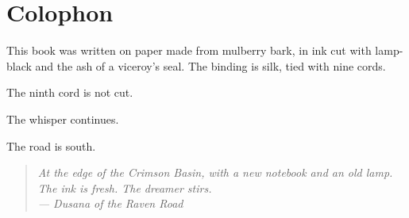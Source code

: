 \documentclass[10pt,twoside]{book}
\newcommand{\dusana}[1]{\begin{quote}\itshape #1 \\ --- Dusana of the Raven Road\end{quote}}
\begin{document}
\chapter*{Colophon}

This book was written on paper made from mulberry bark, in ink cut with lamp-black and the ash of a viceroy's seal. The binding is silk, tied with nine cords.

The ninth cord is not cut.

The whisper continues.

The road is south.

\dusana{At the edge of the Crimson Basin, with a new notebook and an old lamp. The ink is fresh. The dreamer stirs.}
\end{document}
